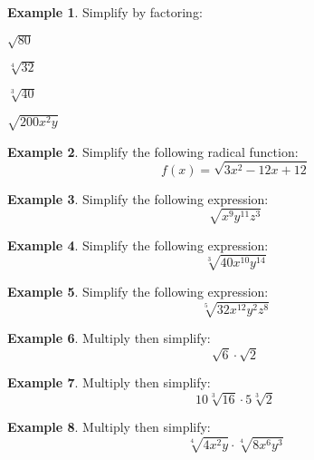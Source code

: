 \documentclass[addpoints,12pt]{exam}
\theoremstyle{definition}
\newtheorem{example}{Example}[subsection]
\begin{document}
\vspace{.25in}

\begin{example}
Simplify by factoring:
\begin{enumerate}
\begin{minipage}{.5\textwidth}
\item $\sqrt{80}$
\vspace{1.5in}
\item $\sqrt[4]{32}$
\vspace{1.5in}
\end{minipage}%
\begin{minipage}{.5\textwidth}
\item $\sqrt[3]{40}$
\vspace{1.5in}
\item $\sqrt{200x^2y}$
\vspace{1.5in}
\end{minipage}%
\end{enumerate}
\end{example}

\vspace{.25in}

\begin{example}
Simplify the following radical function: \[f(x) = \sqrt{3x^2-12x+12}\]
\vspace{1.5in}
\end{example}

\begin{example}
Simplify the following expression: \[\sqrt{x^9y^{11}z^3}\]
\vspace{1.5in}
\end{example}

\begin{example}
Simplify the following expression: \[\sqrt[3]{40x^{10}y^{14}}\]
\vspace{1.5in}
\end{example}

\begin{example}
Simplify the following expression: \[\sqrt[5]{32x^{12}y^2z^8}\]
\vspace{1.5in}
\end{example}

\newpage

\begin{example}
Multiply then simplify: \[\sqrt{6}\cdot\sqrt{2}\]
\vspace{1.25in}
\end{example}

\begin{example}
Multiply then simplify: \[10\sqrt[3]{16}\cdot 5\sqrt[3]{2}\]
\vspace{1.25in}
\end{example}

\begin{example}
Multiply then simplify: \[\sqrt[4]{4x^2y}\cdot\sqrt[4]{8x^6y^3}\]
\vspace{1.25in}
\end{example}
\end{document}
